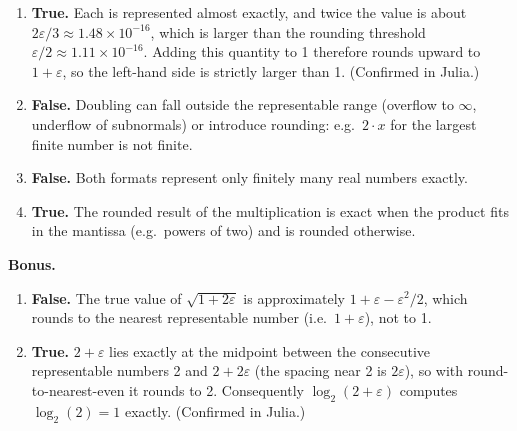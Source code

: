 \documentclass[a4paper]{article}
\begin{document}
\begin{enumerate}[itemsep=8pt]
    \item \textbf{True.}
        Each  is represented almost exactly, and twice the
        value is about $2\varepsilon/3 \approx 1.48 \times 10^{-16}$,
        which is larger than the rounding threshold
        $\varepsilon/2 \approx 1.11 \times 10^{-16}$.
        Adding this quantity to 1 therefore rounds upward to
        $1 + \varepsilon$, so the left-hand side is strictly larger than 1.
        (Confirmed in Julia.)

    \item \textbf{False.}
        Doubling can fall outside the representable range (overflow to
        $\infty$, underflow of subnormals) or introduce rounding: e.g.\
        $2 \cdot x$ for the largest finite number is not finite.

    \item \textbf{False.}
        Both formats represent only finitely many real numbers exactly.

    \item \textbf{True.}
        The rounded result of the multiplication is exact when the product
        fits in the mantissa (e.g.\ powers of two) and is rounded otherwise.
\end{enumerate}

\noindent\textbf{Bonus.}
\begin{enumerate}[itemsep=8pt]
    \item \textbf{False.}
        The true value of $\sqrt{1 + 2\varepsilon}$ is approximately
        $1 + \varepsilon - \varepsilon^2/2$, which rounds to the nearest
        representable number \julia{1 + eps()} (i.e.\ $1 + \varepsilon$),
        not to 1.

    \item \textbf{True.}
        $2 + \varepsilon$ lies exactly at the midpoint between the
        consecutive representable numbers 2 and $2 + 2\varepsilon$
        (the spacing near 2 is $2\varepsilon$), so with round-to-nearest-even
        it rounds to 2. Consequently
        $\log_2(2 + \varepsilon)$ computes $\log_2(2) = 1$ exactly.
        (Confirmed in Julia.)
\end{enumerate}
\fi
\end{document}
